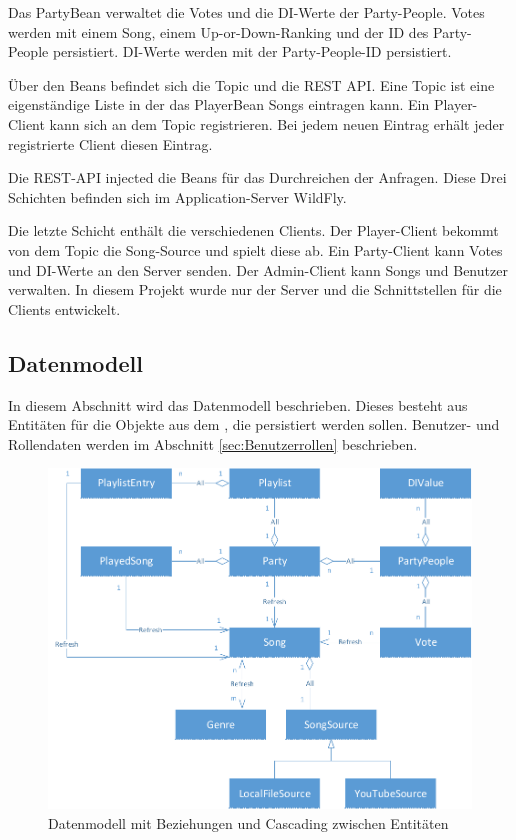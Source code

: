 Das PartyBean verwaltet die Votes und die DI-Werte der Party-People. Votes werden mit einem Song, einem Up-or-Down-Ranking und der ID des Party-People persistiert. DI-Werte werden mit der Party-People-ID persistiert.

Über den Beans befindet sich die Topic und die REST API. Eine Topic ist eine eigenständige Liste in der das PlayerBean Songs eintragen kann. Ein Player-Client kann sich an dem Topic registrieren. Bei jedem neuen Eintrag erhält jeder registrierte Client diesen Eintrag. 

Die REST-API injected die Beans für das Durchreichen der Anfragen. Diese Drei Schichten befinden sich im Application-Server WildFly.

Die letzte Schicht enthält die verschiedenen Clients. Der Player-Client bekommt von dem Topic die Song-Source und spielt diese ab. Ein Party-Client kann Votes und DI-Werte an den Server senden. Der Admin-Client kann Songs und Benutzer verwalten. In diesem Projekt wurde nur der Server und die Schnittstellen für die Clients entwickelt.

\subsection{Datenmodell}

In diesem Abschnitt wird das Datenmodell beschrieben. Dieses besteht aus Entitäten für die Objekte aus dem , die persistiert werden sollen. Benutzer- und Rollendaten werden im Abschnitt \ref{sec:Benutzerrollen} beschrieben.

\begin{figure}[htb]
\centering
\includegraphics[width=1\linewidth]{Bilder/Datenmodell}
\caption{Datenmodell mit Beziehungen und Cascading zwischen Entitäten}
\label{fig:Datenmodell}
\end{figure}

